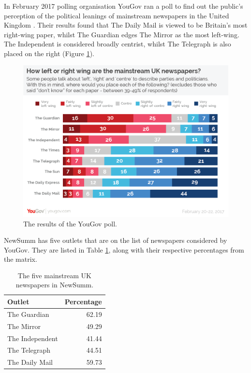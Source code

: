 \documentclass[12pt]{article}
\begin{document}
In February 2017 polling organisation YouGov \cite{yougov} ran a poll to find out the public's perception of the political leanings of mainstream newspapers in the United Kingdom \cite{yougovarticle}. Their results found that The Daily Mail \cite{dailymail} is viewed to be Britain's most right-wing paper, whilst The Guardian \cite{guardian} edges The Mirror \cite{mirror} as the most left-wing. The Independent \cite{independent} is considered broadly centrist, whilst The Telegraph \cite{telegraph} is also placed on the right (Figure \ref{yougov}). 

\begin{figure}[ht!]
  \centering
    \includegraphics[scale=0.4]{yougovpoll.png}
   \caption[A graph depicting responses to the User Interface Survey]{The results of the YouGov poll.}
   \label{yougov}
\end{figure}

NewSumm has five outlets that are on the list of newspapers considered by YouGov. They are listed in Table \ref{mediaorganisations}, along with their respective percentages from the matrix.

\begin{table}[H]
	\centering
	\begin{tabular}{l|r}
		\textbf{Outlet} & \textbf{Percentage} \\ \hline
		The Guardian & 62.19 \\ \hline
		The Mirror & 49.29 \\ \hline
		The Independent & 41.44 \\ \hline
		The Telegraph & 44.51 \\ \hline
		The Daily Mail & 59.73 \\ \hline
	\end{tabular}
	\caption[Parameters for estimating topic models]{The five mainstream UK newspapers in NewSumm.}
	\label{mediaorganisations}
\end{table}
\end{document}
